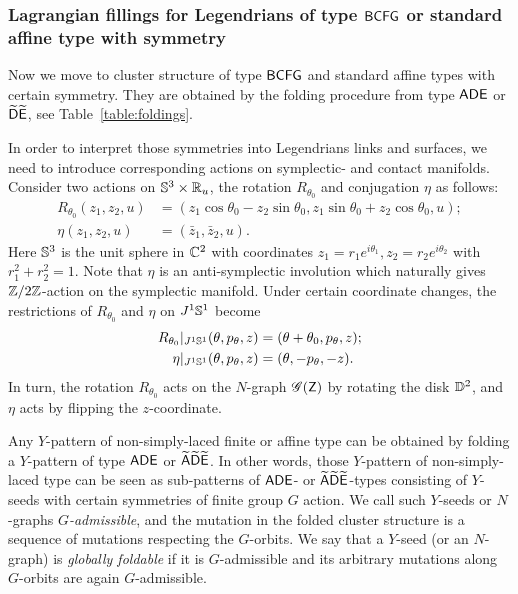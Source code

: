 \subsubsection{Lagrangian fillings for Legendrians of type $\mathsf{BCFG}$ or standard affine type with symmetry}
Now we move to cluster structure of type $\mathsf{BCFG}$ and standard affine types with certain symmetry.
They are obtained by the folding procedure from type $\mathsf{ADE}$ or $\widetilde{\mathsf{D}}\widetilde{\mathsf{E}}$, see
Table~\ref{table:foldings}. 

In order to interpret those symmetries into Legendrians links and surfaces, we need to introduce corresponding actions on symplectic- and contact manifolds.
Consider two actions on $\mathbb{S}^3\times \mathbb{R}_u$, the rotation $R_{\theta_0}$ and conjugation  $\eta$ as follows:
\begin{align*}
R_{\theta_0}(z_1, z_2,u)&=(z_1\cos\theta_0 -z_2\sin\theta_0,z_1\sin\theta_0+z_2\cos\theta_0,u);\\
\eta(z_1,z_2,u)&= (\bar z_1,\bar z_2 ,u).
\end{align*}
Here $\mathbb{S}^3$ is the unit sphere in $\mathbb{C}^2$ with coordinates $z_1=r_1 e^{i\theta_1}, z_2=r_2 e^{i\theta_2}$ with $r_1^2 + r_2^2=1$.
Note that $\eta$ is an anti-symplectic involution which naturally gives $\mathbb{Z}/2\mathbb{Z}$-action on the symplectic manifold.
Under certain coordinate changes, the restrictions of $R_{\theta_0}$ and $\eta$ on $J^1\mathbb{S}^1$ become
\begin{align*}
R_{\theta_0}|_{J^1\mathbb{S}^1}(\theta,p_{\theta},z)&=(\theta+\theta_0,p_{\theta},z);\\
\eta|_{J^1\mathbb{S}^1}(\theta,p_{\theta},z)&=(\theta,-p_{\theta},-z).
\end{align*}
In turn, the rotation $R_{\theta_0}$ acts on the $N$-graph $\mathscr{G}(\mathsf{Z})$ by rotating the disk $\mathbb{D}^2$, and $\eta$ acts by flipping the $z$-coordinate.

Any $Y$-pattern of non-simply-laced finite or affine type can be obtained by folding 
a $Y$-pattern of type $\mathsf{ADE}$ or $\widetilde{\mathsf{A}} \widetilde{\mathsf{D}} \widetilde{\mathsf{E}}$. In other words, 
those $Y$-pattern of non-simply-laced type can be seen as sub-patterns of $\mathsf{ADE}$- or $\widetilde{\mathsf{A}} \widetilde{\mathsf{D}} \widetilde{\mathsf{E}}$-types 
consisting of $Y$-seeds with certain symmetries of finite group $G$ action. We call 
such $Y$-seeds or $N$-graphs \emph{$G$-admissible}, and the mutation in the folded 
cluster structure is a sequence of mutations respecting the $G$-orbits. 
We say that a $Y$-seed (or an $N$-graph) is \emph{globally foldable} if it is 
$G$-admissible and its arbitrary mutations along $G$-orbits are again 
$G$-admissible. 


